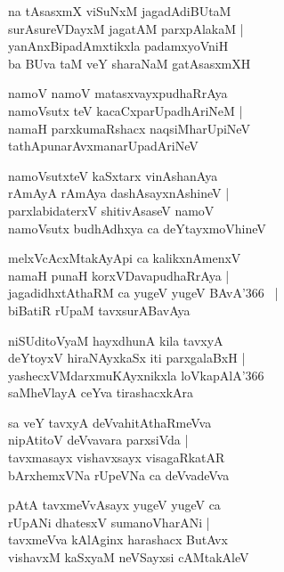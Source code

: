 \documentclass[twoside,12pt,openright]{book}
\newcounter{shloka}[chapter]
\begin{document}
\begin{shloka}%
na tAsasxmX viSuNxM jagadAdiBUtaM \\
surAsureVDayxM jagatAM parxpAlakaM |\\
yanAnxBipadAmxtikxla padamxyoVniH \\
ba BUva taM veY sharaNaM gatAsasxmXH 
\end{shloka}

\begin{shloka}%
namoV namoV matasxvayxpudhaRrAya \\
namoVsutx teV kacaCxparUpadhAriNeM |\\
namaH parxkumaRshacx naqsiMharUpiNeV \\
tathApunarAvxmanarUpadAriNeV 
\end{shloka}

\begin{shloka}%
namoVsutxteV kaSxtarx vinAshanAya \\
rAmAyA rAmAya dashAsayxnAshineV |\\
parxlabidaterxV shitivAsaseV namoV \\
namoVsutx budhAdhxya ca deYtayxmoVhineV 
\end{shloka}

\begin{shloka}%
melxVcAcxMtakAyApi ca kalikxnAmenxV  \\
namaH punaH korxVDavapudhaRrAya |\\
jagadidhxtAthaRM ca yugeV yugeV BAvA\char'366 ~|\\
biBatiR rUpaM tavxsurABavAya
\end{shloka}

\begin{shloka}%
niSUditoVyaM hayxdhunA kila tavxyA \\
deYtoyxV hiraNAyxkaSx iti parxgalaBxH |\\
yashecxVMdarxmuKAyxnikxla loVkapAlA\char'366 ~\\
saMheVlayA ceYva tirashacxkAra
\end{shloka}

\begin{shloka}%
sa veY tavxyA deVvahitAthaRmeVva \\
nipAtitoV deVvavara parxsiVda |\\
tavxmasayx vishavxsayx visagaRkatAR \\
bArxhemxVNa rUpeVNa ca deVvadeVva
\end{shloka}

\begin{shloka}%
pAtA tavxmeVvAsayx yugeV yugeV ca \\
rUpANi dhatesxV sumanoVharANi |\\
tavxmeVva kAlAginx harashacx ButAvx \\
vishavxM kaSxyaM neVSayxsi cAMtakAleV 
\end{shloka}
\end{document}
